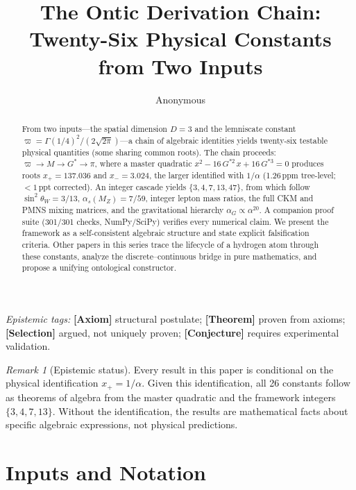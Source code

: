 \documentclass[12pt]{article}
\title{\vspace{-2em}\textbf{The Ontic Derivation Chain:\\[4pt]
\large Twenty-Six Physical Constants from Two Inputs}}
\author{Anonymous}
\date{}
\theoremstyle{definition}
\theoremstyle{remark}
\newtheorem{remark}{Remark}[section]
\newcommand{\epi}[1]{\textnormal{{\small\sffamily\bfseries\color{ftdblue}[#1]}}}
\begin{document}
\maketitle

\begin{abstract}
From two inputs---the spatial dimension $D=3$ and the lemniscate constant
$\varpi = \Gamma(1/4)^2/(2\sqrt{2\pi})$---a chain of algebraic identities
yields twenty-six testable physical quantities (some sharing common roots). The chain proceeds:
$\varpi \to M \to G^{*} \to \pi$, where a master quadratic
$x^2 - 16\,G^{*2}\,x + 16\,G^{*3} = 0$ produces roots
$x_+ = 137.036$ and $x_- = 3.024$, the larger identified with $1/\alpha$ (1.26\,ppm
tree-level; $<\!1$\,ppt corrected). An integer cascade
yields $\{3,4,7,13,47\}$, from which follow
$\sin^2\!\theta_W = 3/13$,
$\alpha_s(M_Z) = 7/59$,
integer lepton mass ratios,
the full CKM and PMNS mixing matrices,
and the gravitational hierarchy $\alpha_G \propto \alpha^{20}$.
A companion proof suite (301/301 checks, NumPy/SciPy) verifies every
numerical claim. We present the framework as a self-consistent algebraic
structure and state explicit falsification criteria.
Other papers in this series trace the lifecycle of a hydrogen atom through these
constants, analyze the discrete--continuous bridge in pure
mathematics, and propose a unifying ontological
constructor.
\end{abstract}

\smallskip
\noindent\textit{Epistemic tags:}
\epi{Axiom} structural postulate;
\epi{Theorem} proven from axioms;
\epi{Selection} argued, not uniquely proven;
\epi{Conjecture} requires experimental validation.

\begin{remark}[Epistemic status]
Every result in this paper is conditional on the physical identification $x_+ = 1/\alpha$. Given this identification, all 26 constants follow as theorems of algebra from the master quadratic and the framework integers $\{3, 4, 7, 13\}$. Without the identification, the results are mathematical facts about specific algebraic expressions, not physical predictions.
\end{remark}

\bigskip

\section{Inputs and Notation}
\end{document}
